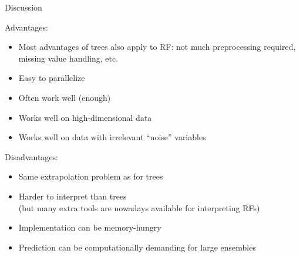 \documentclass[11pt,compress,t,notes=noshow, xcolor=table]{beamer}
\begin{document}
\begin{framev}{Discussion}

Advantages:
\begin{itemize}
  \item Most advantages of trees also apply to RF: not much preprocessing required, missing value handling, etc.
  \item Easy to parallelize
  \item Often work well (enough)
  \item Works well on high-dimensional data
  \item Works well on data with irrelevant \enquote{noise} variables
\end{itemize}

\lz

Disadvantages:
\begin{itemize}
  \item Same extrapolation problem as for trees
  \item Harder to interpret than trees \\
    (but many extra tools are nowadays
    available for interpreting RFs)
  \item Implementation can be memory-hungry
  \item Prediction can be computationally demanding for large ensembles
\end{itemize}

\end{framev}

\endlecture
\end{document}
